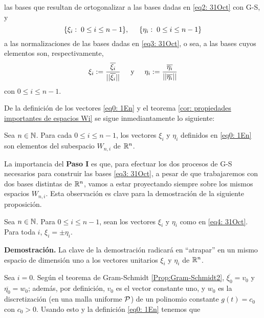 \begin{itemize}
las bases que resultan de ortogonalizar a 
las bases dadas en \eqref{eq2: 31Oct} con G-S, y 
\begin{equation}
\label{eq4: 31Oct}
\{\xi_{i}: \hspace{0.1cm} 0 \leq i \leq n-1  \}, \hspace{0.5cm}
\{\eta_{i}: \hspace{0.1cm} 0 \leq i \leq n-1 \}
\end{equation}
a las normalizaciones de las bases dadas en 
\eqref{eq3: 31Oct}, o sea, a las bases cuyos elementos son,
respectivamente,
\begin{equation}
\label{eq0: 1En}
\xi_{i}:= \frac{\overline{\xi_{i}}}{||\overline{\xi_{i}}||}
\hspace{0.5cm} \text{y} \hspace{0.5cm}
\eta_{i}:= \frac{\overline{\eta_{i}}}{||\overline{\eta_{i}}||}
\end{equation}
con $0 \leq i \leq n-1$.

De la definición de los vectores \eqref{eq0: 1En}
y el teorema \eqref{cor: propiedades importantes de espacios Wi} se
sigue inmediantamente lo siguiente:

\begin{obs}
\label{obs: los xi y los etai son elementos de Wni}
Sea $n \in \mathbb{N}$. 
Para cada $0 \leq i \leq n-1$, los vectores
$\xi_{i}$ y $\eta_{i}$ 
definidos en \eqref{eq0: 1En} \\
son elementos del
subespacio $W_{n, i}$ de $\mathbb{R}^{n}$.
\end{obs}

La importancia del \textbf{Paso I} es que, 
para efectuar los dos
procesos de G-S necesarios para
construir las bases 
\eqref{eq3: 31Oct}, a pesar de que trabajaremos
con dos bases distintas de $\mathbb{R}^{n}$,
vamos a estar proyectando siempre sobre 
los mismos espacios $W_{n,i}$.
Esta observación es clave para la 
demostración de la siguiente proposición.


\begin{prop} \label{prop:signo}
Sea $n \in \mathbb{N}$.
Para $0 \leq i \leq n-1$, sean los vectores $\xi_{i}$
y $\eta_{i}$ como en \eqref{eq4: 31Oct}. \\
Para toda $i$, $\xi_{i}= \pm \eta_{i}$.
\end{prop}
\noindent
\textbf{Demostración.}
La clave de la demostración
radicará en ``atrapar'' en un mismo espacio de 
dimensión uno a los vectores
unitarios $\xi_{i}$ y $\eta_{i}$ de $\mathbb{R}^{n}$. 


Sea $i=0$. Según el teorema de Gram-Schmidt
\ref{Prop:Gram-Schmidt2}, $\overline{\xi_{0}}=v_{0}$
y $\overline{\eta_{0}}=w_{0}$; además,
por definición, $v_{0}$ es
el vector constante uno, y
$w_{0}$ es la discretización (en una malla uniforme $\mathcal{P}$)
de un polinomio constante $g(t)=c_{0}$ con $c_{0}>0$.
Usando esto y la definición \eqref{eq0: 1En}
tenemos que


\end{itemize}
